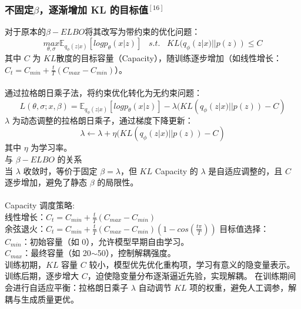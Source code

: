 \documentclass[final]{ws-ijseke}
\begin{document}
\subsubsection{不固定$\beta$，逐渐增加 KL 的目标值$^{[16]}$}
对于原本的$\beta-ELBO$将其改写为带约束的优化问题：\\
\begin{equation*}
    \underset{\theta,\sigma}{max}\mathbb{E}_{q_\phi(z|x)}[logp_\theta(x|z)] \,\,\,\,\,s.t.\,\,\,\,\,KL(q_\phi(z|x)||p(z)) \le C
\end{equation*}
其中 $C$ 为 $KL$散度的目标容量（Capacity），随训练逐步增加（如线性增长：$C_t = C_{min}+ \frac{t}{T}(C_{max}-C_{min})$）。\\\\
通过拉格朗日乘子法，将约束优化转化为无约束问题：
\begin{equation*}
    L(\theta,\sigma;x,\beta) = \mathbb{E}_{q_\phi(z|x)}[logp_\theta(x|z)]-\lambda( KL(q_\phi(z|x)||p(z))-C)
\end{equation*}
$\lambda$ 为动态调整的拉格朗日乘子，通过梯度下降更新：
\begin{equation*}
    \lambda ← \lambda + \eta( KL(q_\phi(z|x)||p(z))-C)
\end{equation*}
其中 $\eta$ 为学习率。\\
与 $\beta-ELBO$ 的关系\\
当 $\lambda$ 收敛时，等价于固定 $\beta = \lambda$，但 $KL$ Capacity 的 $\lambda$ 是自适应调整的，且 $C$ 逐步增加，避免了静态 $\beta$ 的局限性。\\\\
Capacity 调度策略:\\
线性增长：$C_t = C_{min}+ \frac{t}{T}(C_{max}-C_{min})$\\
余弦退火：$C_t = C_{min}+ \frac{t}{T}(C_{max}-C_{min})(1-cos(\frac{t\pi}{T}))$
目标值选择：\\
$C_{min}$：初始容量（如 0），允许模型早期自由学习。\\
$C_{max}$：最终容量（如 20$\sim$50），控制解耦强度。\\
\hspace*{2em} 训练初期，$KL$ 容量 $C$ 较小，模型优先优化重构项，学习有意义的隐变量表示。
训练后期，逐步增大 $C$，迫使隐变量分布逐渐逼近先验，实现解耦。
在训练期间会进行自适应平衡：拉格朗日乘子 $\lambda$ 自动调节 $KL$ 项的权重，避免人工调参，解耦与生成质量更优。
\end{document}
